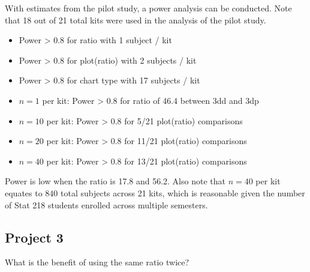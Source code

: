 \documentclass[phd]{nuthesis}
\begin{document}
With estimates from the pilot study, a power analysis can be conducted.
Note that 18 out of 21 total kits were used in the analysis of the pilot
study.

\begin{itemize}
\item
  Power \textgreater{} 0.8 for ratio with 1 subject / kit
\item
  Power \textgreater{} 0.8 for plot(ratio) with 2 subjects / kit
\item
  Power \textgreater{} 0.8 for chart type with 17 subjects / kit
\item
  \(n=1\) per kit: Power \textgreater{} 0.8 for ratio of 46.4 between
  3dd and 3dp
\item
  \(n=10\) per kit: Power \textgreater{} 0.8 for 5/21 plot(ratio)
  comparisons
\item
  \(n=20\) per kit: Power \textgreater{} 0.8 for 11/21 plot(ratio)
  comparisons
\item
  \(n=40\) per kit: Power \textgreater{} 0.8 for 13/21 plot(ratio)
  comparisons
\end{itemize}

Power is low when the ratio is 17.8 and 56.2. Also note that \(n=40\)
per kit equates to \(840\) total subjects across 21 kits, which is
reasonable given the number of Stat 218 students enrolled across
multiple semesters.

\subsection{Project 3}\label{project-3}

What is the benefit of using the same ratio twice?
\end{document}
